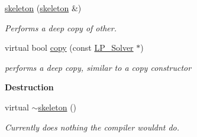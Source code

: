 \begin{Indent}
\begin{DoxyCompactItemize}
\mbox{\label{group___c_l_s_solvers_abbb0828dc5cd38edf09093e738510d7a}} 
\hyperlink{group___c_l_s_solvers_abbb0828dc5cd38edf09093e738510d7a}{skeleton} (\hyperlink{group___c_l_s_solvers_classskeleton}{skeleton} \&)
\begin{DoxyCompactList}\small\item\em Performs a deep copy of {\ttfamily other}. \end{DoxyCompactList}\item 
virtual bool \hyperlink{group___c_l_s_solvers_a42d30b92f27936eab11d0fa4f0cc10b4}{copy} (const \hyperlink{group___c_l_s_solvers_class_l_p___solver}{L\+P\+\_\+\+Solver} $\ast$)
\begin{DoxyCompactList}\small\item\em performs a deep copy, similar to a copy constructor \end{DoxyCompactList}\end{DoxyCompactItemize}
\end{Indent}
\begin{Indent}\textbf{ Destruction}\par
\begin{DoxyCompactItemize}
\item 
\mbox{\label{group___c_l_s_solvers_ae8874234344e5e51f9b81f6199ee2aa6}} 
virtual \hyperlink{group___c_l_s_solvers_ae8874234344e5e51f9b81f6199ee2aa6}{$\sim$skeleton} ()
\begin{DoxyCompactList}\small\item\em Currently does nothing the compiler wouldn\textquotesingle{}t do. \end{DoxyCompactList}\end{DoxyCompactItemize}
\end{Indent}
